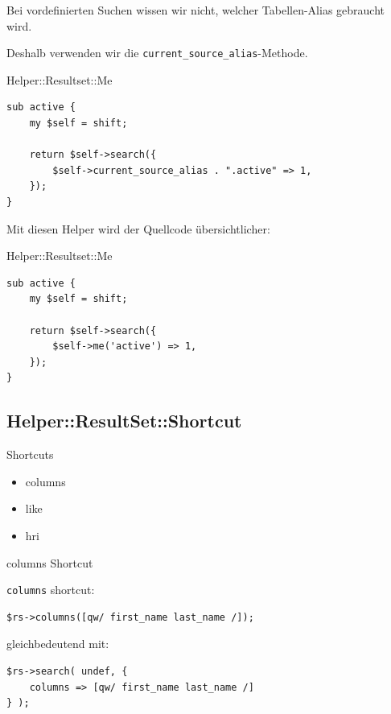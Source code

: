 Bei vordefinierten Suchen wissen wir nicht, welcher Tabellen-Alias
gebraucht wird.

Deshalb verwenden wir die \verb|current_source_alias|-Methode.

\begin{frame}[fragile]{Helper::Resultset::Me}
\begin{lstlisting}
sub active {
    my $self = shift;

    return $self->search({ 
        $self->current_source_alias . ".active" => 1,
    });
}
\end{lstlisting}
\end{frame}

Mit diesen Helper wird der Quellcode übersichtlicher:

\begin{frame}[fragile]{Helper::Resultset::Me}
\begin{lstlisting}
sub active {
    my $self = shift;

    return $self->search({ 
        $self->me('active') => 1,
    });
}
\end{lstlisting}
\end{frame}

\subsection{Helper::ResultSet::Shortcut}




\begin{frame}{Shortcuts}
\begin{itemize}
\item columns
\item like
\item hri
\end{itemize}
\end{frame}

\begin{frame}[fragile]{columns Shortcut}

\verb|columns| shortcut:

\begin{lstlisting}
$rs->columns([qw/ first_name last_name /]);
\end{lstlisting}

gleichbedeutend mit:

\begin{lstlisting}
$rs->search( undef, { 
    columns => [qw/ first_name last_name /] 
} );
\end{lstlisting}
\end{frame}

